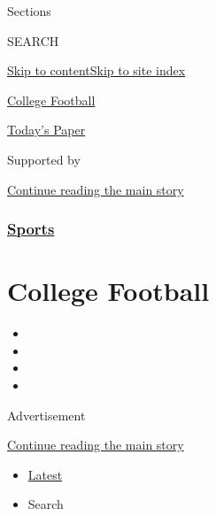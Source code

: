 Sections

SEARCH

\protect\hyperlink{site-content}{Skip to
content}\protect\hyperlink{site-index}{Skip to site index}

\href{https://www.nytimes.com/section/sports/ncaafootball}{College
Football}

\href{https://myaccount.nytimes.com/auth/login?response_type=cookie\&client_id=vi}{}

\href{https://www.nytimes.com/section/todayspaper}{Today's Paper}

Supported by

\protect\hyperlink{after-sponsor}{Continue reading the main story}

\hypertarget{sports}{%
\subsubsection{\texorpdfstring{\href{/section/sports}{Sports}}{Sports}}\label{sports}}

\hypertarget{college-football}{%
\section{College Football}\label{college-football}}

\begin{itemize}
\item
\item
\item
\item
\end{itemize}

Advertisement

\protect\hyperlink{after-subheader}{Continue reading the main story}

\begin{itemize}
\tightlist
\item
  \protect\hyperlink{stream-panel}{Latest}
\item
  Search
\end{itemize}

